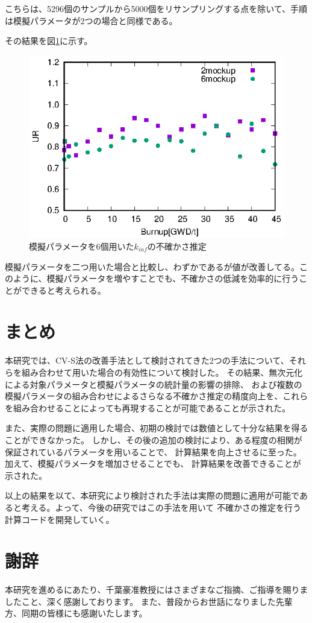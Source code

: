 \documentclass[a4paper,11pt,titlepage,uplatex]{jsreport}
\begin{document}
こちらは、5296個のサンプルから5000個をリサンプリングする点を除いて、手順は模擬パラメータが2つの場合と同様である。

その結果を図\ref{fig:6mockup}に示す。
\begin{figure}[H]
  \centering
  \includegraphics{6mockup.eps}
  \caption{模擬パラメータを6個用いた$k_{inf}$の不確かさ推定}
  \label{fig:6mockup}
\end{figure}

模擬パラメータを二つ用いた場合と比較し、わずかであるが値が改善してる。このように、模擬パラメータを増やすことでも、不確かさの低減を効率的に行うことができると考えられる。
\newpage

\chapter{まとめ}
本研究では、CV-S法の改善手法として検討されてきた2つの手法について、それらを組み合わせて用いた場合の有効性について検討した。
その結果、無次元化による対象パラメータと模擬パラメータの統計量の影響の排除、
および複数の模擬パラメータの組み合わせによるさらなる不確かさ推定の精度向上を、これらを組み合わせることによっても再現することが可能であることが示された。

また、実際の問題に適用した場合、初期の検討では数値として十分な結果を得ることができなかった。
しかし、その後の追加の検討により、ある程度の相関が保証されているパラメータを用いることで、
計算結果を向上させるに至った。加えて、模擬パラメータを増加させることでも、
計算結果を改善できることが示された。

以上の結果を以て、本研究により検討された手法は実際の問題に適用が可能であると考える。よって、今後の研究ではこの手法を用いて
不確かさの推定を行う計算コードを開発していく。

\newpage


\chapter*{謝辞}
本研究を進めるにあたり、千葉豪准教授にはさまざまなご指摘、ご指導を賜りましたこと、深く感謝しております。
また、普段からお世話になりました先輩方、同期の皆様にも感謝いたします。
\end{document}

